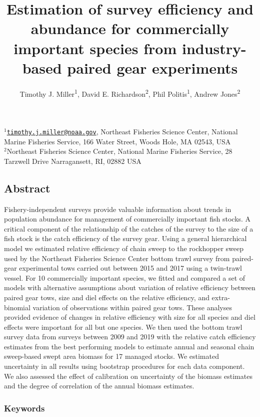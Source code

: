 \documentclass[
  12pt,
]{article}
\title{Estimation of survey efficiency and abundance for commercially
important species from industry-based paired gear experiments}
\author{Timothy J. Miller\textsuperscript{1}, David E.
Richardson\textsuperscript{2}, Phil Politis\textsuperscript{1}, Andrew
Jones\textsuperscript{2}}
\date{}
\begin{document}
\maketitle

\(^1\)\href{mailto:timothy.j.miller@noaa.gov}{\nolinkurl{timothy.j.miller@noaa.gov}},
Northeast Fisheries Science Center, National Marine Fisheries Service,
166 Water Street, Woods Hole, MA 02543, USA\\
\(^2\)Northeast Fisheries Science Center, National Marine Fisheries
Service, 28 Tarzwell Drive Narragansett, RI, 02882 USA\\

\pagebreak

\hypertarget{abstract}{%
\subsection*{Abstract}\label{abstract}}

Fishery-independent surveys provide valuable information about trends in
population abundance for management of commercially important fish
stocks. A critical component of the relationship of the catches of the
survey to the size of a fish stock is the catch efficiency of the survey
gear. Using a general hierarchical model we estimated relative
efficiency of chain sweep to the rockhopper sweep used by the Northeast
Fisheries Science Center bottom trawl survey from paired-gear
experimental tows carried out between 2015 and 2017 using a twin-trawl
vessel. For 10 commercially important species, we fitted and compared a
set of models with alternative assumptions about variation of relative
efficiency between paired gear tows, size and diel effects on the
relative efficiency, and extra-binomial variation of observations within
paired gear tows. These analyses provided evidence of changes in
relative efficiency with size for all species and diel effects were
important for all but one species. We then used the bottom trawl survey
data from surveys between 2009 and 2019 with the relative catch
efficiency estimates from the best performing models to estimate annual
and seasonal chain sweep-based swept area biomass for 17 managed stocks.
We estimated uncertainty in all results using bootstrap procedures for
each data component. We also assessed the effect of calibration on
uncertainty of the biomass estimates and the degree of correlation of
the annual biomass estimates.

\hypertarget{keywords}{%
\subsubsection*{Keywords}\label{keywords}}
\end{document}
